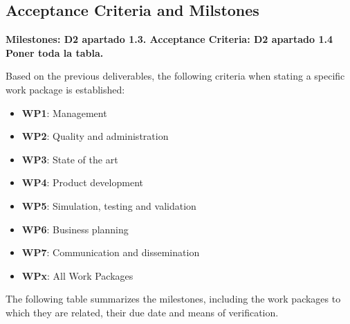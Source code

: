 \subsection{Acceptance Criteria and Milstones}

\textbf{Milestones: D2 apartado 1.3. Acceptance Criteria: D2 apartado 1.4 Poner toda la tabla.}

Based on the previous deliverables, the following criteria when stating a specific work package is established:
\begin{itemize} 	
	\item \textbf{WP1}: Management 
	\item \textbf{WP2}: Quality and administration
	\item \textbf{WP3}: State of the art
	\item \textbf{WP4}: Product development
	\item \textbf{WP5}: Simulation, testing and validation
	\item \textbf{WP6}: Business planning
	\item \textbf{WP7}: Communication and dissemination
	\item \textbf{WPx}: All Work Packages
\end{itemize}

The following table summarizes the milestones, including the work packages to which they are related, their due date and means of verification.

